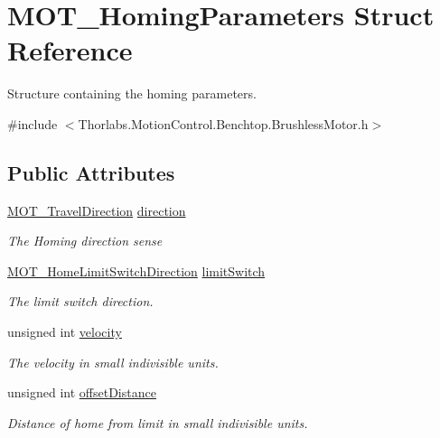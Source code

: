 \hypertarget{struct_m_o_t___homing_parameters}{}\section{M\+O\+T\+\_\+\+Homing\+Parameters Struct Reference}
\label{struct_m_o_t___homing_parameters}


Structure containing the homing parameters.  




{\ttfamily \#include $<$Thorlabs.\+Motion\+Control.\+Benchtop.\+Brushless\+Motor.\+h$>$}

\subsection*{Public Attributes}
\begin{DoxyCompactItemize}
\item 
\hyperlink{group___common_ga70a2a2ac296464f3d846c30d71d18daa}{M\+O\+T\+\_\+\+Travel\+Direction} \hyperlink{struct_m_o_t___homing_parameters_ad609201d95a81d0abf0250188709f5db}{direction}
\begin{DoxyCompactList}\small\item\em The Homing direction sense \end{DoxyCompactList}\item 
\hyperlink{group___common_ga31437a532fa07483a38ddb3098eddc81}{M\+O\+T\+\_\+\+Home\+Limit\+Switch\+Direction} \hyperlink{struct_m_o_t___homing_parameters_ab64d2806f38fa72a8df49fd870882f98}{limit\+Switch}
\begin{DoxyCompactList}\small\item\em The limit switch direction. \end{DoxyCompactList}\item 
unsigned int \hyperlink{struct_m_o_t___homing_parameters_af9765ed6807401164426e93056cf27a1}{velocity}
\begin{DoxyCompactList}\small\item\em The velocity in small indivisible units. \end{DoxyCompactList}\item 
unsigned int \hyperlink{struct_m_o_t___homing_parameters_a251f800551a5e608ef5cb5b4ccb273b4}{offset\+Distance}
\begin{DoxyCompactList}\small\item\em Distance of home from limit in small indivisible units. \end{DoxyCompactList}\end{DoxyCompactItemize}


